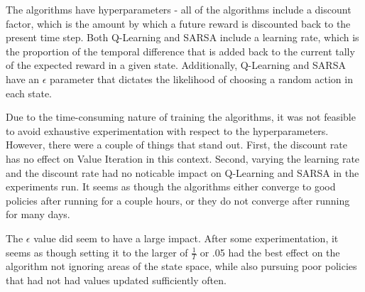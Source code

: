 \documentclass{amsart}
\begin{document}
    The algorithms have hyperparameters - all of the algorithms include a discount factor, which is the amount by which
    a future reward is discounted back to the present time step. Both Q-Learning and SARSA include a
    learning rate, which is the proportion of the temporal difference that is added back to the current tally of the
    expected reward in a given state. Additionally, Q-Learning and SARSA have an $\epsilon$ parameter that dictates
    the likelihood of choosing a random action in each state.

    Due to the time-consuming nature of training the algorithms, it was not feasible to avoid exhaustive
    experimentation with respect to the hyperparameters. However, there were a couple of things
    that stand out. First, the discount rate has no effect on Value Iteration in this context. Second,
    varying the learning rate and the discount rate had no noticable impact on Q-Learning and SARSA
    in the experiments run. It seems as though the algorithms either converge to good policies after
    running for a couple hours, or they do not converge after running for many days.

    The $\epsilon$ value did seem to have a large impact. After some experimentation, it seems as though
    setting it to the larger of $\frac{1}{T}$ or .05 had the best effect on the algorithm not ignoring
    areas of the state space, while also pursuing poor policies that had not had values updated sufficiently often.
\end{document}
